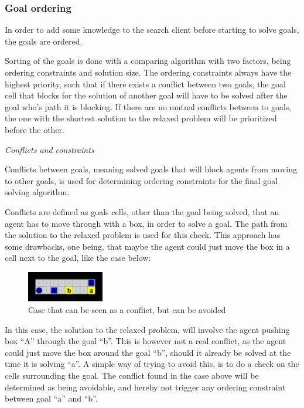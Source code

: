 \documentclass[Main]{subfiles}
\begin{document}
\subsubsection{Goal ordering}

In order to add some knowledge to the search client before starting to solve goals, the goals are ordered. 

Sorting of the goals is done with a comparing algorithm with two factors, being ordering constraints and solution size. The ordering constraints always have the highest priority, such that if there exists a conflict between two goals, the goal cell that blocks for the solution of another goal will have to be solved after the goal who's path it is blocking. If there are no mutual conflicts between to goals, the one with the shortest solution to the relaxed problem will be prioritized before the other. 




\textit{Conflicts and constraints}

Conflicts between goals, meaning solved goals that will block agents from moving to other goals, is used for determining ordering constraints for the final goal solving algorithm. 

Conflicts are defined as goals cells, other than the goal being solved, that an agent has to move through with a box, in order to solve a goal. The path from the solution to the relaxed problem is used for this check. This approach has some drawbacks, one being, that maybe the agent could just move the box in a cell next to the goal, like the case below: \\

\begin{figure}[h!]
    \centering
    \includegraphics[width=0.3\textwidth]{conflict.png}
    \caption{Case that can be seen as a conflict, but can be avoided}
    \label{fig:conflict_avoidable}
\end{figure}


In this case, the solution to the relaxed problem, will involve the agent pushing box ``A'' through the goal ``b''. This is however not a real conflict, as the agent could just move the box around the goal ``b'', should it already be solved at the time it is solving ``a''. A simple way of trying to avoid this, is to do a check on the cells surrounding the goal. 
The conflict found in the case above will be determined as being avoidable, and hereby not trigger any ordering constraint between goal ``a'' and ``b''. 
\end{document}
